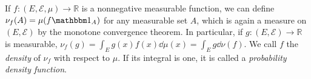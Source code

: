 \begin{example}
	If \( f \colon (E, \mathcal E, \mu) \to \mathbb R \) is a nonnegative measurable function, we can define \( \nu_f(A) = \mu(f \mathbbm 1_A) \) for any measurable set \( A \), which is again a measure on \( (E, \mathcal E) \) by the monotone convergence theorem.
	In particular, if \( g \colon (E, \mathcal E) \to \mathbb R \) is measurable, \( \nu_f(g) = \int_E g(x) f(x) \dd{\mu(x)} = \int_E g \dd{\nu(f)} \).
	We call \( f \) the \emph{density} of \( \nu_f \) with respect to \( \mu \).
	If its integral is one, it is called a \emph{probability density function}.
\end{example}
